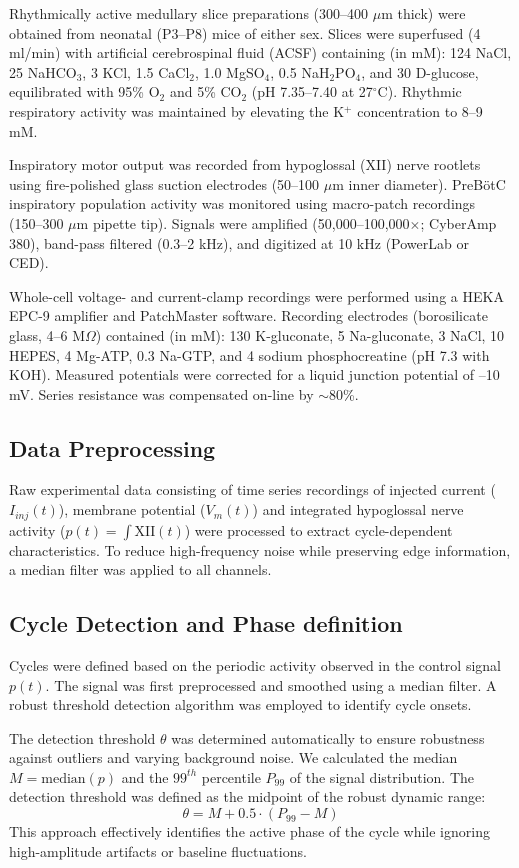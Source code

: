 \documentclass{article}
\begin{document}
Rhythmically active medullary slice preparations (300--400 $\mu$m thick) were obtained from neonatal (P3--P8) mice of either sex. Slices were superfused (4 ml/min) with artificial cerebrospinal fluid (ACSF) containing (in mM): 124 NaCl, 25 NaHCO$_3$, 3 KCl, 1.5 CaCl$_2$, 1.0 MgSO$_4$, 0.5 NaH$_2$PO$_4$, and 30 D-glucose, equilibrated with 95\% O$_2$ and 5\% CO$_2$ (pH 7.35--7.40 at 27$^\circ$C). Rhythmic respiratory activity was maintained by elevating the K$^+$ concentration to 8--9 mM.

Inspiratory motor output was recorded from hypoglossal (XII) nerve rootlets using fire-polished glass suction electrodes (50--100 $\mu$m inner diameter). PreBötC inspiratory population activity was monitored using macro-patch recordings (150--300 $\mu$m pipette tip). Signals were amplified (50,000--100,000$\times$; CyberAmp 380), band-pass filtered (0.3--2 kHz), and digitized at 10 kHz (PowerLab or CED).

Whole-cell voltage- and current-clamp recordings were performed using a HEKA EPC-9 amplifier and PatchMaster software. Recording electrodes (borosilicate glass, 4--6 M$\Omega$) contained (in mM): 130 K-gluconate, 5 Na-gluconate, 3 NaCl, 10 HEPES, 4 Mg-ATP, 0.3 Na-GTP, and 4 sodium phosphocreatine (pH 7.3 with KOH). Measured potentials were corrected for a liquid junction potential of --10 mV. Series resistance was compensated on-line by $\sim$80\%.

\subsection{Data Preprocessing}
Raw experimental data consisting of time series recordings of injected current ($I_{inj}(t)$), membrane potential ($V_m(t)$) and integrated hypoglossal nerve activity ($p(t) = \int \text{XII}(t)$) were processed to extract cycle-dependent characteristics. To reduce high-frequency noise while preserving edge information, a median filter was applied to all channels.

\subsection{Cycle Detection and Phase definition}
Cycles were defined based on the periodic activity observed in the control signal $p(t)$. The signal was first preprocessed and smoothed using a median filter. A robust threshold detection algorithm was employed to identify cycle onsets.

The detection threshold $\theta$ was determined automatically to ensure robustness against outliers and varying background noise. We calculated the median $M = \text{median}(p)$ and the $99^{th}$ percentile $P_{99}$ of the signal distribution. The detection threshold was defined as the midpoint of the robust dynamic range:
\begin{equation}
    \theta = M + 0.5 \cdot (P_{99} - M)
\end{equation}
This approach effectively identifies the active phase of the cycle while ignoring high-amplitude artifacts or baseline fluctuations.
\end{document}
